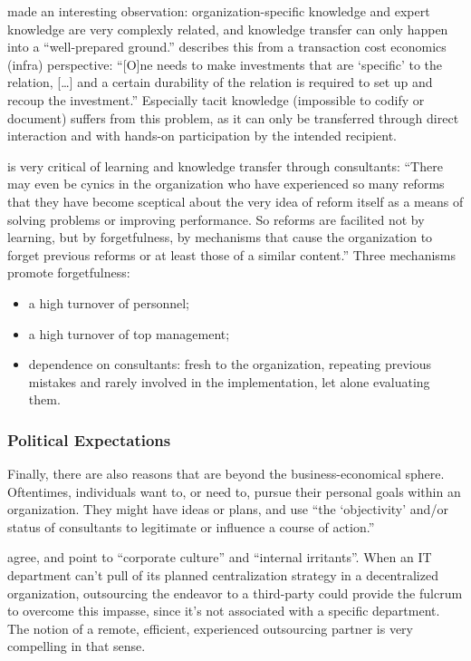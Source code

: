 \documentclass[12pt]{article}
\begin{document}
\citet[84]{fincham2002} made an interesting observation:
organization-specific knowledge and expert knowledge are very complexly
related, and knowledge transfer can only happen into a ``well-prepared
ground.'' \citet[922]{nooteboom2000} describes this from a transaction
cost economics (infra) perspective: ``{[}O{]}ne needs to make
investments that are `specific' to the relation, {[}\ldots{]} and a
certain durability of the relation is required to set up and recoup the
investment.'' Especially tacit knowledge (impossible to codify or
document) suffers from this problem, as it can only be transferred
through direct interaction and with hands-on participation by the
intended recipient.

\citet[41-42]{brunson1993} is very critical of learning and knowledge
transfer through consultants: ``There may even be cynics in the
organization who have experienced so many reforms that they have become
sceptical about the very idea of reform itself as a means of solving
problems or improving performance. So reforms are facilited not by
learning, but by forgetfulness, by mechanisms that cause the
organization to forget previous reforms or at least those of a similar
content.'' Three mechanisms promote forgetfulness:

\begin{itemize}
\item
  a high turnover of personnel;
\item
  a high turnover of top management;
\item
  dependence on consultants: fresh to the organization, repeating
  previous mistakes and rarely involved in the implementation, let alone
  evaluating them.
\end{itemize}

\subsubsection{Political Expectations}\label{political-expectations}

Finally, there are also reasons that are beyond the business-economical
sphere. Oftentimes, individuals want to, or need to, pursue their
personal goals within an organization. They might have ideas or plans,
and use ``the `objectivity' and/or status of consultants to legitimate
or influence a course of action.'' \citep[ 233]{sturdy1998}

\citet[14]{mcfarlan1995} agree, and point to ``corporate culture'' and
``internal irritants''. When an IT department can't pull of its planned
centralization strategy in a decentralized organization, outsourcing the
endeavor to a third-party could provide the fulcrum to overcome this
impasse, since it's not associated with a specific department. The
notion of a remote, efficient, experienced outsourcing partner is very
compelling in that sense.
\end{document}
